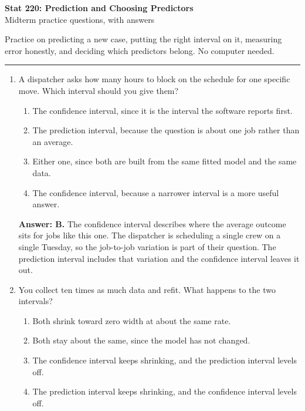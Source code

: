 \documentclass[11pt]{article}
\begin{document}
\begin{center}
{\Large\textbf{Stat 220: Prediction and Choosing Predictors}}\\[3pt]
{\large Midterm practice questions, with answers}\\[6pt]
\end{center}

Practice on predicting a new case, putting the right interval on it, measuring error honestly,
and deciding which predictors belong. No computer needed.

\vspace{8pt}
\hrule
\vspace{10pt}

\begin{enumerate}[itemsep=14pt]
\item A dispatcher asks how many hours to block on the schedule for one specific move. Which interval should you give them?

\begin{enumerate}[label=\Alph*., itemsep=1pt, topsep=3pt]
  \item The confidence interval, since it is the interval the software reports first.
  \item The prediction interval, because the question is about one job rather than an average.
  \item Either one, since both are built from the same fitted model and the same data.
  \item The confidence interval, because a narrower interval is a more useful answer.
\end{enumerate}

\vspace{2pt}
\textbf{Answer: B.} The confidence interval describes where the average outcome sits for jobs like this one. The dispatcher is scheduling a single crew on a single Tuesday, so the job-to-job variation is part of their question. The prediction interval includes that variation and the confidence interval leaves it out.
\vspace{4pt}

\item You collect ten times as much data and refit. What happens to the two intervals?

\begin{enumerate}[label=\Alph*., itemsep=1pt, topsep=3pt]
  \item Both shrink toward zero width at about the same rate.
  \item Both stay about the same, since the model has not changed.
  \item The confidence interval keeps shrinking, and the prediction interval levels off.
  \item The prediction interval keeps shrinking, and the confidence interval levels off.
\end{enumerate}


\end{enumerate}
\end{document}

